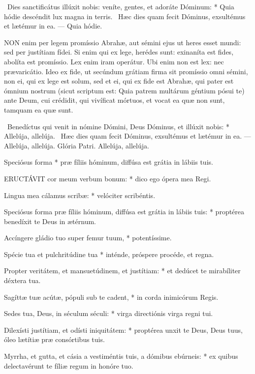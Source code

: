 \R\ Dies sanctificátus illúxit nobis: veníte, gentes, et adoráte Dóminum: * Quia hódie descéndit lux magna in terris. \V\ Hæc dies quam fecit Dóminus, exsultémus et lætémur in ea. --- Quia hódie.


\lettrine[lines=2]{N}{ON} enim per legem promíssio Abrahæ, aut sémini ejus ut heres esset mundi: sed per justítiam fídei. Si enim qui ex lege, herédes sunt: exinaníta est fides, abolíta est promíssio. Lex enim iram operátur. Ubi enim non est lex: nec prævaricátio. Ideo ex fide, ut secúndum grátiam firma sit promíssio omni sémini, non ei, qui ex lege est solum, sed et ei, qui ex fide est Abrahæ, qui pater est ómnium nostrum (sicut scriptum est: Quia patrem multárum géntium pósui te) ante Deum, cui crédidit, qui vivíficat mórtuos, et vocat ea quæ non sunt, tamquam ea quæ sunt.

\R\ Benedíctus qui venit in nómine Dómini, Deus Dóminus, et illúxit nobis: * Allelúja, allelúja. \V\ Hæc dies quam fecit Dóminus, exsultémus et lætémur in ea. --- Allelúja, allelúja. Glória Patri. Allelúja, allelúja.


 Speciósus forma * præ fíliis hóminum, diffúsa est grátia in lábiis tuis.


\lettrine[lines=2]{E}{RUCTÁVIT} cor meum verbum bonum: * dico ego ópera mea Regi.

Lingua mea cálamus scribæ: * velóciter scribéntis.

Speciósus forma præ fíliis hóminum, diffúsa est grátia in lábiis tuis: * proptérea benedíxit te Deus in ætérnum.

Accíngere gládio tuo super femur tuum, * potentíssime.

Spécie tua et pulchritúdine tua * inténde, próspere procéde, et regna.

Propter veritátem, et mansuetúdinem, et justítiam: * et dedúcet te mirabíliter déxtera tua.

Sagíttæ tuæ acútæ, pópuli sub te cadent, * in corda inimicórum Regis.

Sedes tua, Deus, in séculum séculi: * virga directiónis virga regni tui.

Dilexísti justítiam, et odísti iniquitátem: * proptérea unxit te Deus, Deus tuus, óleo lætítiæ præ consórtibus tuis.

Myrrha, et gutta, et cásia a vestiméntis tuis, a dómibus ebúrneis: * ex quibus delectavérunt te fíliæ regum in honóre tuo.

